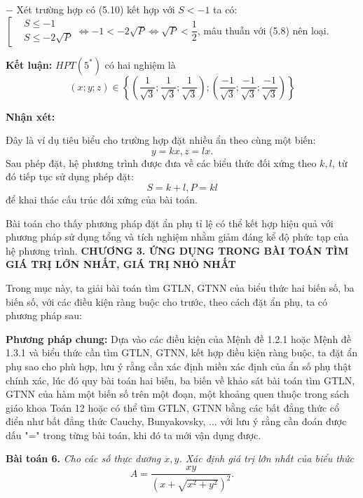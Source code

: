 \documentclass[12pt]{report}
\begin{document}
\vspace{0.2cm}
\noindent $-$ Xét trường hợp có (5.10) kết hợp với $S < -1$ ta có: $\left[ \begin{aligned} &S \leq -1 \\ &S \leq -2\sqrt{P} \end{aligned} \right. \Leftrightarrow -1 < -2\sqrt{P} \Leftrightarrow \sqrt{P} < \dfrac{1}{2}$, mâu thuẫn với (5.8) nên loại.

\vspace{0.3cm}
\noindent \textbf{Kết luận:} $HPT(5^*)$ có hai nghiệm là
\[
(x;y;z) \in \left\{ \left( \dfrac{1}{\sqrt{3}}; \dfrac{1}{\sqrt{3}}; \dfrac{1}{\sqrt{3}} \right); \left( \dfrac{-1}{\sqrt{3}}; \dfrac{-1}{\sqrt{3}}; \dfrac{-1}{\sqrt{3}} \right) \right\}
\]

\noindent \textbf{Nhận xét:}

\noindent Đây là ví dụ tiêu biểu cho trường hợp đặt nhiều ẩn theo cùng một biến:
\[
y = kx, z = lx.
\]
\noindent Sau phép đặt, hệ phương trình được đưa về các biểu thức đối xứng theo $k, l$, từ đó tiếp tục sử dụng phép đặt:
\[
S = k + l, P = kl
\]
\noindent để khai thác cấu trúc đối xứng của bài toán.

\vspace{0.2cm}
\noindent Bài toán cho thấy phương pháp đặt ẩn phụ tỉ lệ có thể kết hợp hiệu quả với phương pháp sử dụng tổng và tích nghiệm nhằm giảm đáng kể độ phức tạp của hệ phương trình.
\newpage
\noindent \textbf{CHƯƠNG 3. ỨNG DỤNG TRONG BÀI TOÁN TÌM GIÁ TRỊ LỚN NHẤT, GIÁ TRỊ NHỎ NHẤT}

\vspace{0.3cm}
\noindent 
Trong mục này, ta giải bài toán tìm GTLN, GTNN của biểu thức hai biến số, ba biến số, với các điều kiện ràng buộc cho trước, theo cách đặt ẩn phụ, ta có phương pháp sau:

\vspace{0.2cm}
\noindent \textbf{Phương pháp chung:} Dựa vào các điều kiện của Mệnh đề 1.2.1 hoặc Mệnh đề 1.3.1 và biểu thức cần tìm GTLN, GTNN, kết hợp điều kiện ràng buộc, ta đặt ẩn phụ sao cho phù hợp, lưu ý rằng cần xác định miền xác định của ẩn số phụ thật chính xác, lúc đó quy bài toán hai biến, ba biến về khảo sát bài toán tìm GTLN, GTNN của hàm một biến số trên một đoạn, một khoảng quen thuộc trong sách giáo khoa Toán 12 hoặc có thể tìm GTLN, GTNN bằng các bất đẳng thức cổ điển như bất đẳng thức Cauchy, Bunyakovsky, ... với lưu ý rằng cần đoán được dấu "=" trong từng bài toán, khi đó ta mới vận dụng được.

\vspace{0.4cm}
\noindent \textbf{Bài toán 6.} \textit{Cho các số thực dương $x, y$. Xác định giá trị lớn nhất của biểu thức}
\[
A = \dfrac{xy}{\left(x + \sqrt{x^2 + y^2}\right)^2}.
\]
\end{document}
